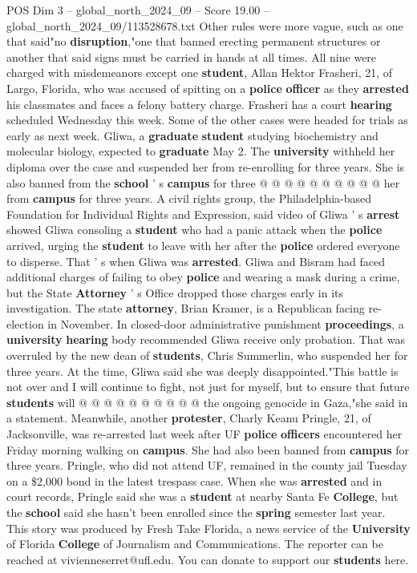 \begin{textsample}{POS Dim 3 – global\_north\_2024\_09 – Score 19.00 – global\_north\_2024\_09/113528678.txt}
Other rules were more vague, such as one that said"no \textbf{disruption},"one that banned erecting permanent structures or another that said signs must be carried in hands at all times.
All nine were charged with misdemeanors except one \textbf{student}, Allan Hektor Frasheri, 21, of Largo, Florida, who was accused of spitting on a \textbf{police} \textbf{officer} as they \textbf{arrested} his classmates and faces a felony battery charge.
Frasheri has a court \textbf{hearing} scheduled Wednesday this week.
Some of the other cases were headed for trials as early as next week.
Gliwa, a \textbf{graduate} \textbf{student} studying biochemistry and molecular biology, expected to \textbf{graduate} May 2.
The \textbf{university} withheld her diploma over the case and suspended her from re-enrolling for three years.
She is also banned from the \textbf{school} ' s \textbf{campus} for three @ @ @ @ @ @ @ @ @ @ her from \textbf{campus} for three years.
A civil rights group, the Philadelphia-based Foundation for Individual Rights and Expression, said video of Gliwa ' s \textbf{arrest} showed Gliwa consoling a \textbf{student} who had a panic attack when the \textbf{police} arrived, urging the \textbf{student} to leave with her after the \textbf{police} ordered everyone to disperse.
That ' s when Gliwa was \textbf{arrested}.
Gliwa and Bisram had faced additional charges of failing to obey \textbf{police} and wearing a mask during a crime, but the State \textbf{Attorney} ' s Office dropped those charges early in its investigation.
The state \textbf{attorney}, Brian Kramer, is a Republican facing re-election in November.
In closed-door administrative punishment \textbf{proceedings}, a \textbf{university} \textbf{hearing} body recommended Gliwa receive only probation.
That was overruled by the new dean of \textbf{students}, Chris Summerlin, who suspended her for three years.
At the time, Gliwa said she was deeply disappointed."This battle is not over and I will continue to fight, not just for myself, but to ensure that future \textbf{students} will @ @ @ @ @ @ @ @ @ @ the ongoing genocide in Gaza,"she said in a statement.
Meanwhile, another \textbf{protester}, Charly Keanu Pringle, 21, of Jacksonville, was re-arrested last week after UF \textbf{police} \textbf{officers} encountered her Friday morning walking on \textbf{campus}.
She had also been banned from \textbf{campus} for three years.
Pringle, who did not attend UF, remained in the county jail Tuesday on a \$2,000 bond in the latest trespass case.
When she was \textbf{arrested} and in court records, Pringle said she was a \textbf{student} at nearby Santa Fe \textbf{College}, but the \textbf{school} said she hasn't been enrolled since the \textbf{spring} semester last year.
This story was produced by Fresh Take Florida, a news service of the \textbf{University} of Florida \textbf{College} of Journalism and Communications.
The reporter can be reached at vivienneserret@ufl.edu.
You can donate to support our \textbf{students} here.

\end{textsample}
